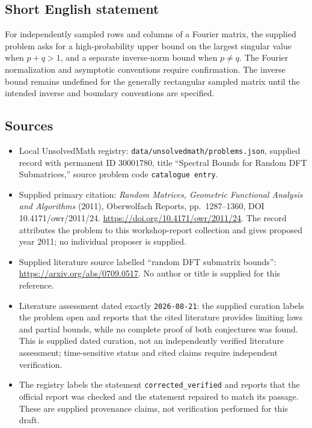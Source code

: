 \documentclass[11pt]{article}
\begin{document}
\subsection{Short English statement}
For independently sampled rows and columns of a Fourier matrix, the supplied problem asks for a high-probability upper bound on the largest singular value when \(p+q>1\), and a separate inverse-norm bound when \(p\ne q\). The Fourier normalization and asymptotic conventions require confirmation. The inverse bound remains undefined for the generally rectangular sampled matrix until the intended inverse and boundary conventions are specified.
\subsection{Sources}
\begin{itemize}
\item Local UnsolvedMath registry: \texttt{data/unsolvedmath/problems.json}, supplied record with permanent ID \(30001780\), title ``Spectral Bounds for Random DFT Submatrices,'' source problem code \texttt{catalogue entry}.
\item Supplied primary citation: \emph{Random Matrices, Geometric Functional Analysis and Algorithms} (2011), Oberwolfach Reports, pp.\ 1287--1360, DOI 10.4171/owr/2011/24. \url{https://doi.org/10.4171/owr/2011/24}. The record attributes the problem to this workshop-report collection and gives proposed year 2011; no individual proposer is supplied.
\item Supplied literature source labelled ``random DFT submatrix bounds'': \url{https://arxiv.org/abs/0709.0517}. No author or title is supplied for this reference.
\item Literature assessment dated exactly \texttt{2026-08-21}: the supplied curation labels the problem open and reports that the cited literature provides limiting laws and partial bounds, while no complete proof of both conjectures was found. This is supplied dated curation, not an independently verified literature assessment; time-sensitive status and cited claims require independent verification.
\item The registry labels the statement \texttt{corrected\_verified} and reports that the official report was checked and the statement repaired to match its passage. These are supplied provenance claims, not verification performed for this draft.
\end{itemize}
\end{document}
